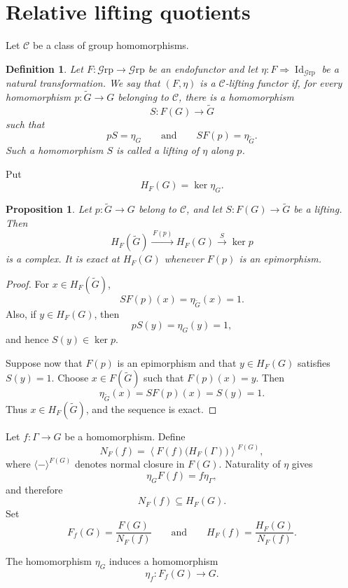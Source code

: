 \documentclass[10pt]{amsart}
\newtheorem{proposition}[theorem]{Proposition}
\newtheorem{definition}[theorem]{Definition}
\renewcommand{\*}{\cdot {\dots} \cdot}
\newcommand{\?}[1]{\overset{?}{#1}}
\newcommand{\Grp}{\mathcal{G}\text{rp}}
\numberwithin{equation}{section}
\begin{document}
\section{Relative lifting quotients}
\label{sec:lifting-functors}
Let $\mathcal C$ be a class of group homomorphisms.

\begin{definition}\label{def:C-lifting-functor}
Let
\(
F\colon\Grp\longrightarrow\Grp
\)
be an endofunctor and let
\(
\eta\colon F\Longrightarrow\operatorname{Id}_{\Grp}
\)
be a natural transformation. We say that $(F,\eta)$ is a
\emph{$\mathcal C$-lifting functor} if, for every homomorphism
\(
p\colon\widetilde G\longrightarrow G
\)
belonging to $\mathcal C$, there is a homomorphism
\[
S\colon F(G)\longrightarrow\widetilde G
\]
such that
\[
pS=\eta_G
\qquad\text{and}\qquad
SF(p)=\eta_{\widetilde G}.
\]
Such a homomorphism $S$ is called a \emph{lifting of $\eta$
along $p$}.
\end{definition}
Put
\[
H_F(G)=\ker\eta_G.
\]
\begin{proposition}\label{prop:lifting-kernel-sequence}
Let $p\colon \widetilde G\to G$ belong to $\mathcal C$, and let
$S\colon F(G)\to\widetilde G$ be a lifting. Then
\[
H_F(\widetilde G)
\xrightarrow{\,F(p)\,}
H_F(G)
\xrightarrow{\,S\,}
\ker p
\]
is a complex. It is exact at $H_F(G)$ whenever $F(p)$ is an
epimorphism.
\end{proposition}

\begin{proof}
For $x\in H_F(\widetilde G)$,
\[
SF(p)(x)=\eta_{\widetilde G}(x)=1.
\]
Also, if $y\in H_F(G)$, then
\[
pS(y)=\eta_G(y)=1,
\]
and hence $S(y)\in\ker p$.

Suppose now that $F(p)$ is an epimorphism and that
$y\in H_F(G)$ satisfies $S(y)=1$. Choose
$x\in F(\widetilde G)$ such that $F(p)(x)=y$. Then
\[
\eta_{\widetilde G}(x)
   =SF(p)(x)
   =S(y)
   =1.
\]
Thus $x\in H_F(\widetilde G)$, and the sequence is exact.
\end{proof}

Let $f\colon\Gamma\to G$ be a homomorphism. Define
\[
N_F(f)=
\left\langle F(f)\bigl(H_F(\Gamma)\bigr)
\right\rangle^{F(G)},
\]
where $\langle - \rangle^{F(G)}$ denotes normal closure in $F(G)$.
Naturality of $\eta$ gives
\[
\eta_GF(f)=f\eta_\Gamma,
\]
and therefore
\[
N_F(f)\subseteq H_F(G).
\]
Set
\[
F_f(G)=\frac{F(G)}{N_F(f)}
\qquad\text{and}\qquad
H_F(f)=\frac{H_F(G)}{N_F(f)}.
\]

The homomorphism $\eta_G$ induces a homomorphism
\[
\eta_f\colon F_f(G)\longrightarrow G.
\]
\end{document}
